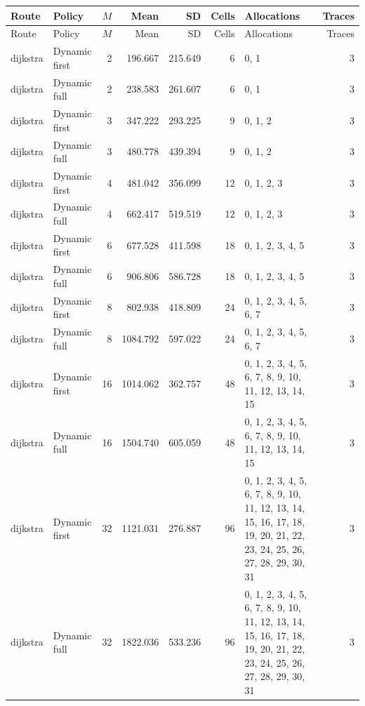 \documentclass[10pt,a4paper]{article}
\begin{document}
\tiny\setlength{\tabcolsep}{2pt}\begin{longtable}{@{}p{23mm}p{29mm}rrrrp{36mm}r@{}}
\toprule Route & Policy & $M$ & Mean & SD & Cells & Allocations & Traces \\ \midrule\endfirsthead
\toprule Route & Policy & $M$ & Mean & SD & Cells & Allocations & Traces \\ \midrule\endhead
\bottomrule\endfoot
dijkstra & Dynamic first & 2 & 196.667 & 215.649 & 6 & 0, 1 & 3 \\
dijkstra & Dynamic full & 2 & 238.583 & 261.607 & 6 & 0, 1 & 3 \\
dijkstra & Dynamic first & 3 & 347.222 & 293.225 & 9 & 0, 1, 2 & 3 \\
dijkstra & Dynamic full & 3 & 480.778 & 439.394 & 9 & 0, 1, 2 & 3 \\
dijkstra & Dynamic first & 4 & 481.042 & 356.099 & 12 & 0, 1, 2, 3 & 3 \\
dijkstra & Dynamic full & 4 & 662.417 & 519.519 & 12 & 0, 1, 2, 3 & 3 \\
dijkstra & Dynamic first & 6 & 677.528 & 411.598 & 18 & 0, 1, 2, 3, 4, 5 & 3 \\
dijkstra & Dynamic full & 6 & 906.806 & 586.728 & 18 & 0, 1, 2, 3, 4, 5 & 3 \\
dijkstra & Dynamic first & 8 & 802.938 & 418.809 & 24 & 0, 1, 2, 3, 4, 5, 6, 7 & 3 \\
dijkstra & Dynamic full & 8 & 1084.792 & 597.022 & 24 & 0, 1, 2, 3, 4, 5, 6, 7 & 3 \\
dijkstra & Dynamic first & 16 & 1014.062 & 362.757 & 48 & 0, 1, 2, 3, 4, 5, 6, 7, 8, 9, 10, 11, 12, 13, 14, 15 & 3 \\
dijkstra & Dynamic full & 16 & 1504.740 & 605.059 & 48 & 0, 1, 2, 3, 4, 5, 6, 7, 8, 9, 10, 11, 12, 13, 14, 15 & 3 \\
dijkstra & Dynamic first & 32 & 1121.031 & 276.887 & 96 & 0, 1, 2, 3, 4, 5, 6, 7, 8, 9, 10, 11, 12, 13, 14, 15, 16, 17, 18, 19, 20, 21, 22, 23, 24, 25, 26, 27, 28, 29, 30, 31 & 3 \\
dijkstra & Dynamic full & 32 & 1822.036 & 533.236 & 96 & 0, 1, 2, 3, 4, 5, 6, 7, 8, 9, 10, 11, 12, 13, 14, 15, 16, 17, 18, 19, 20, 21, 22, 23, 24, 25, 26, 27, 28, 29, 30, 31 & 3 \\
\end{longtable}\normalsize\setlength{\tabcolsep}{6pt}
\clearpage
\end{document}
